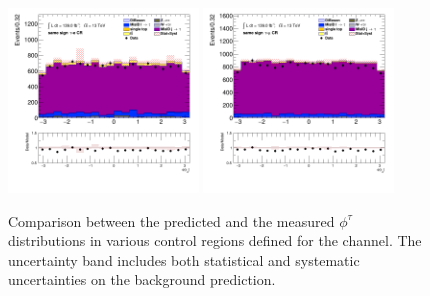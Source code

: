 \begin{figure}[!htp]
\begin{center}
			\includegraphics[width=0.45\textwidth]{chapters/chapter6_HPlus/images/taulep/tau_0_phi_SS_TAUEL.png} 
			\includegraphics[width=0.45\textwidth]{chapters/chapter6_HPlus/images/taulep/tau_0_phi_SS_TAUMU.png} \\
			\end{center}
			\caption{
			Comparison between the predicted and the measured $\phi^{\tau}$ distributions in various control regions defined for the \taulep channel. The uncertainty band includes both statistical and systematic uncertainties on the background prediction. 
			}
			\label{fig:bkg-phi-tau-taulep}
		\end{figure}


